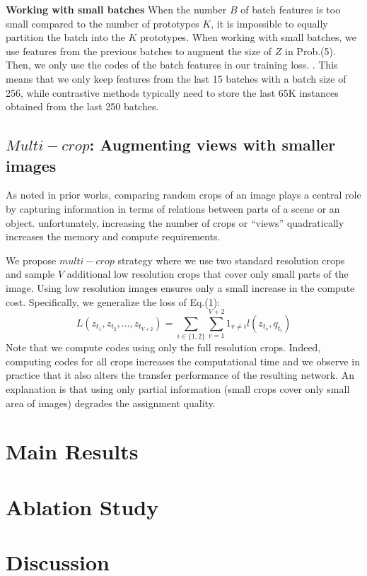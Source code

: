 \documentclass{tufte-handout}
\begin{document}
\textbf{Working with small batches} When the number $B$ of batch features is too small compared to the number of prototypes $K$, it is impossible to equally partition the batch into the $K$ prototypes.
When working with small batches, we use features from the previous batches to augment the size of $Z$ in Prob.(5). 
Then, we only use the codes of the batch features in our training loss. .
This means that we only keep features from the last 15 batches with a batch size of 256, while contrastive methods typically need to store the last 65K instances obtained from the last 250 batches.

\subsection{$Multi-crop$: Augmenting views with smaller images}
As noted in prior works, comparing random crops of an image plays a central role by capturing information in terms of relations between parts of a scene or an object.
unfortunately, increasing the number of crops or ``views'' quadratically increases the memory and compute requirements. 

We propose $multi-crop$ strategy where we use two standard resolution crops and sample $V$ additional low resolution crops that cover only small parts of the image.
Using low resolution images ensures only a small increase in the compute cost.
Specifically, we generalize the loss of Eq.(1):
\begin{equation}
  L(z_{t_1}, z_{t_2}, \ldots, z_{t_{V+2}}) = \sum_{i \in \{1,2\}} \sum_{v=1}^{V+2} 1_{v \neq i} l(z_{t_v}, q_{t_i})
\end{equation}
Note that we compute codes using only the full resolution crops. Indeed, computing codes for all crops increases the computational time and we observe in practice that it also alters the transfer performance of the resulting network. 
An explanation is that using only partial information (small crops cover only small area of images) degrades the assignment quality.
\section{Main Results}

\section{Ablation Study}
\section{Discussion}






\end{document}
